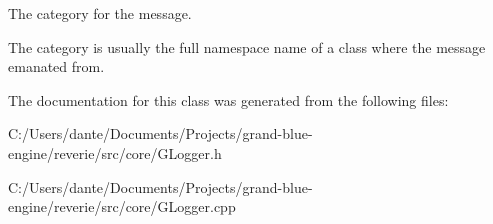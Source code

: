 The category for the message. 

The category is usually the full namespace name of a class where the message emanated from. 

The documentation for this class was generated from the following files\+:\begin{DoxyCompactItemize}
\item 
C\+:/\+Users/dante/\+Documents/\+Projects/grand-\/blue-\/engine/reverie/src/core/G\+Logger.\+h\item 
C\+:/\+Users/dante/\+Documents/\+Projects/grand-\/blue-\/engine/reverie/src/core/G\+Logger.\+cpp\end{DoxyCompactItemize}
